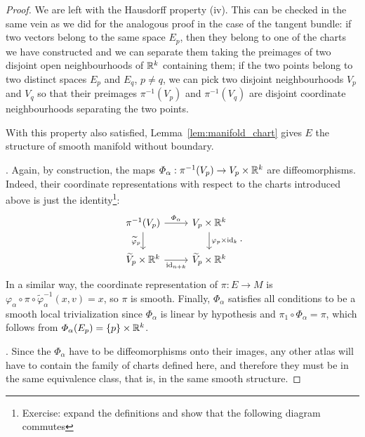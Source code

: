 \begin{proof}
  We are left with the Hausdorff property (iv).
  This can be checked in the same vein as we did for the analogous proof in the case of the tangent bundle:
  if two vectors belong to the same space $E_p$, then they belong to one of the charts we have constructed and we can separate them taking the preimages of two disjoint open neighbourhoods of $\mathbb{R}^k$ containing them; if the two points belong to two distinct spaces $E_p$ and $E_q$, $p\neq q$, we can pick two disjoint neighbourhoods $V_p$ and $V_q$ so that their preimages $\pi^{-1}(V_p)$ and $\pi^{-1}(V_q)$ are disjoint coordinate neighbourhoods separating the two points.

  With this property also satisfied, Lemma~\ref{lem:manifold_chart} gives $E$ the structure of smooth manifold without boundary.

  .
  Again, by construction, the maps $\varPhi_\alpha : \pi^{-1}(V_p) \to V_p\times\mathbb{R}^k$ are diffeomorphisms.
  Indeed, their coordinate representations with respect to the charts introduced above is just the identity\footnote{Exercise: expand the definitions and show that the following diagram commutes}:
  \begin{equation}
    \begin{tikzcd}
      {\pi^{-1}(V_p)} & {V_p\times\R^k} \\
      {\widetilde{V}_p\times\R^k} & {\widetilde{V}_p\times\R^k}
      \arrow["{\varPhi_\alpha}", from=1-1, to=1-2]
      \arrow["{\varphi_p\times\id_k}", from=1-2, to=2-2]
      \arrow["{\widetilde{\varphi}_p}"', from=1-1, to=2-1]
      \arrow["{\id_{n+k}}"', from=2-1, to=2-2]
    \end{tikzcd}.
  \end{equation}
  In a similar way, the coordinate representation of $\pi : E \to M$ is $\varphi_\alpha \circ \pi \circ \widetilde{\varphi}_\alpha^{-1} (x,v) = x$, so $\pi$ is smooth.
  Finally, $\Phi_\alpha$ satisfies all conditions to be a smooth local trivialization since $\varPhi_\alpha$ is linear by hypothesis and $\pi_1 \circ \varPhi_\alpha = \pi$, which follows from $\varPhi_\alpha(E_p) = \{p\}\times \mathbb{R}^k$.

  .
  Since the $\varPhi_\alpha$ have to be diffeomorphisms onto their images, any other atlas will have to contain the family of charts defined here, and therefore they must be in the same equivalence class, that is, in the same smooth structure.
\end{proof}

